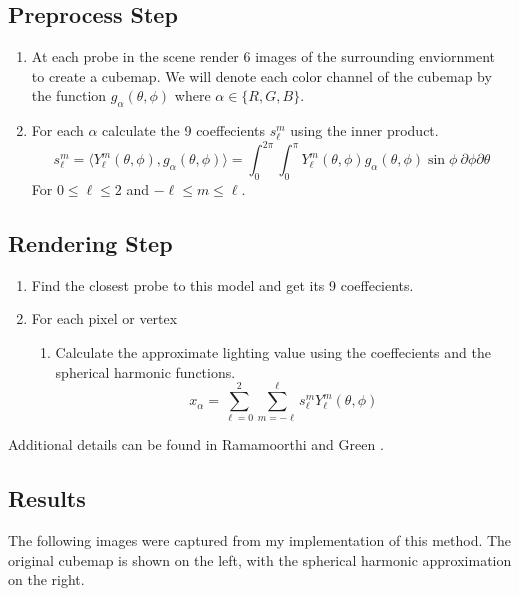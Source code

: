 \documentclass{article}
\theoremstyle{definition}
\theoremstyle{definition}
\begin{document}
\subsection*{Preprocess Step}
\begin{enumerate}
    \item At each probe in the scene render 6 images of the surrounding enviornment to create a cubemap. We will denote each color channel of the cubemap by the function $g_{\alpha}(\theta, \phi)$ where $\alpha\in \{R, G, B \}$.
    \item For each $\alpha$ calculate the 9 coeffecients $s_{\ell}^{m}$ using the inner product.
        $$s_{\ell}^{m}=\langle Y_{\ell}^{m}(\theta, \phi), g_{\alpha}(\theta, \phi) \rangle=
        \int_{0}^{2\pi}\int_{0}^{\pi} Y_{\ell}^{m}(\theta, \phi) g_{\alpha}(\theta, \phi) \sin\phi\ \partial\phi \partial\theta$$
        For $0\leq\ell\leq2$ and $-\ell\leq m \leq\ell$.
\end{enumerate}

\subsection*{Rendering Step}
\begin{enumerate}
    \item Find the closest probe to this model and get its 9 coeffecients.
    \item For each pixel or vertex
        \begin{enumerate}
            \item Calculate the approximate lighting value using the coeffecients and the spherical harmonic functions.
                $$x_{\alpha}=\sum_{\ell=0}^{2} \sum_{m=-\ell}^{\ell} s_{\ell}^{m}Y_{\ell}^{m}(\theta, \phi)$$ 

        \end{enumerate}
\end{enumerate}

Additional details can be found in Ramamoorthi \cite{sh-lighting} and Green \cite{sh-gritty}.

\subsection*{Results}

The following images were captured from my implementation of this method. The original cubemap is shown on the left, with the spherical harmonic approximation on the right.
\end{document}
